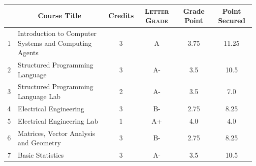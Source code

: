 \documentclass[11pt]{article}
\newcommand*{\numtwo}[1]{\pgfmathprintnumber[
                    fixed, precision=2, fixed zerofill=true]{#1}}
\begin{document}
                \begin{center}
                    \renewcommand{\arraystretch}{1.08}
                    
                \begin{tabular}{|c|l|c|>{\scshape}c|c|c|}
                \hline  \rule[-1ex]{0pt}{3.5ex} {\centering{\bf Course Code}} &  \multicolumn{1}{c|}{\textbf{Course Title}}  & {\bf Credits} & {\bf Letter Grade} & {\bf Grade Point} & {\bf Point Secured}  \\ 
                \hline   1 &  Introduction to Computer Systems and Computing Agents		 & 3 & A & 3.75 & 11.25 \\ %
                \hline   2 &  Structured Programming Language		 & 3 & A- & 3.5 & 10.5 \\ %
                \hline   3 &  Structured Programming Language Lab		 & 2 & A- & 3.5 & 7.0 \\ %
                \hline   4 &  Electrical Engineering		 & 3 & B- & 2.75 & 8.25 \\ %
                \hline   5 &  Electrical Engineering Lab		 & 1 & A+ & 4.0 & 4.0 \\ %
                \hline   6 &  Matrices, Vector Analysis and Geometry		 & 3 & B- & 2.75 & 8.25 \\ %
                \hline   7 &  Basic Statistics		 & 3 & A- & 3.5 & 10.5 \\ %

\hline                %
                \end{tabular}
                \end{center}
                \renewcommand{\arraystretch}{1.03}
\end{document}
